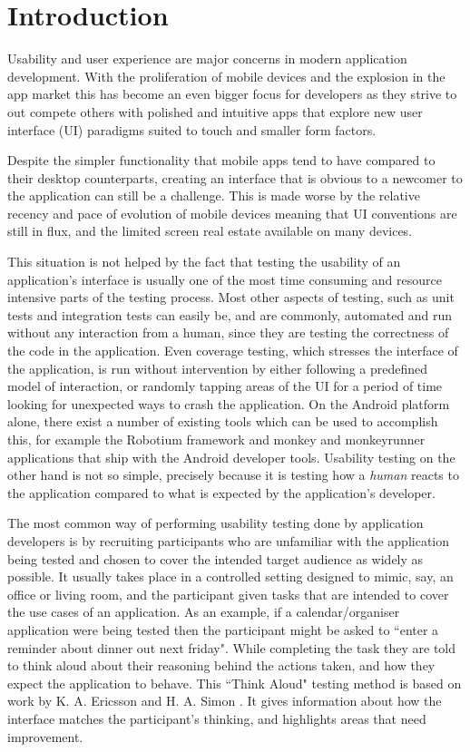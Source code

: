 \chapter{Introduction}

Usability and user experience are major concerns in modern application
development. With the proliferation of mobile devices and the explosion in the
app market this has become an even bigger focus for developers as they strive to
out compete others with polished and intuitive apps that explore new user
interface (UI) paradigms suited to touch and smaller form factors.

Despite the simpler functionality that mobile apps tend to have compared to
their desktop counterparts, creating an interface that is obvious to a newcomer
to the application can still be a challenge. This is made worse by the relative
recency and pace of evolution of mobile devices meaning that UI conventions are
still in flux, and the limited screen real estate available on many devices.

This situation is not helped by the fact that testing the usability of an application's interface is usually one of the most time
consuming and resource intensive parts of the testing process. Most other
aspects of testing, such as unit tests and integration tests can easily be, and are commonly, automated and run without any
interaction from a human, since they are testing the correctness of the code in
the application. Even coverage testing, which stresses the interface of the application, is run without intervention by
either following a predefined model of interaction, or randomly tapping areas of
the UI for a period of time looking for unexpected ways to crash the
application. On the Android platform alone, there exist a number of existing tools which can be used to
accomplish this, for example the Robotium \cite{robotium} framework and monkey
and monkeyrunner \cite{monkeyrunner} applications that ship with the Android
developer tools. Usability testing on the other hand is not so simple, precisely
because it is testing how a \emph{human} reacts to the application compared to
what is expected by the application's developer.

The most common way of performing usability testing done by application developers is by recruiting participants who are
unfamiliar with the application being tested and chosen to cover the intended
target audience as widely as possible. It usually takes place in a controlled
setting designed to mimic, say, an office or living room, and the participant
given tasks that are intended to cover the use cases of an application. 
As an example, if a calendar/organiser application were being tested then the participant might be
asked to ``enter a reminder about dinner out next friday". While completing the task they are
told to think aloud about their reasoning behind the actions taken, and how they expect the
application to behave. This ``Think Aloud" testing method is based on
work by K. A. Ericsson and H. A. Simon \cite{ericsson1980verbal}. It gives
information about how the interface matches the participant's thinking, and
highlights areas that need improvement.

